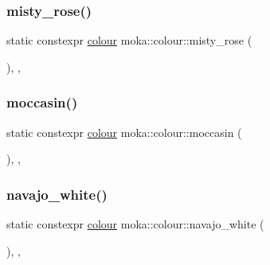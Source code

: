 \mbox{\label{classmoka_1_1colour_ade045aa0ed34003700a03432da5d072a}} 
\subsubsection{\texorpdfstring{misty\_rose()}{misty\_rose()}}
{\footnotesize\ttfamily static constexpr \mbox{\hyperlink{classmoka_1_1colour}{colour}} moka\+::colour\+::misty\+\_\+rose (\begin{DoxyParamCaption}{ }\end{DoxyParamCaption})\hspace{0.3cm}{\ttfamily [inline]}, {\ttfamily [static]}, {\ttfamily [noexcept]}}

\mbox{\label{classmoka_1_1colour_ae642c04d3915e7cffa71e69173391773}} 
\subsubsection{\texorpdfstring{moccasin()}{moccasin()}}
{\footnotesize\ttfamily static constexpr \mbox{\hyperlink{classmoka_1_1colour}{colour}} moka\+::colour\+::moccasin (\begin{DoxyParamCaption}{ }\end{DoxyParamCaption})\hspace{0.3cm}{\ttfamily [inline]}, {\ttfamily [static]}, {\ttfamily [noexcept]}}

\mbox{\label{classmoka_1_1colour_adde5b40c475fd858ba3fe3ee134ed2cb}} 
\subsubsection{\texorpdfstring{navajo\_white()}{navajo\_white()}}
{\footnotesize\ttfamily static constexpr \mbox{\hyperlink{classmoka_1_1colour}{colour}} moka\+::colour\+::navajo\+\_\+white (\begin{DoxyParamCaption}{ }\end{DoxyParamCaption})\hspace{0.3cm}{\ttfamily [inline]}, {\ttfamily [static]}, {\ttfamily [noexcept]}}

